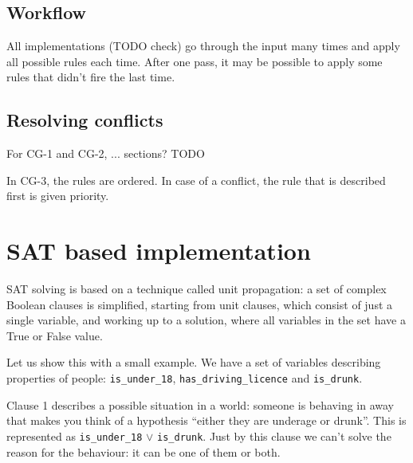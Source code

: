 \documentclass[a4paper, 11pt]{article}
\begin{document}
\subsection{Workflow}

All implementations (TODO check) go through the input many times and apply all possible rules each time. 
After one pass, it may be possible to apply some rules that didn't fire the last time.


\subsection{Resolving conflicts}

For CG-1 and CG-2, ... sections? TODO

In CG-3, the rules are ordered. In case of a conflict, the rule that is described first is given priority.


\section{SAT based implementation}

SAT solving is based on a technique called unit propagation:
a set of complex Boolean clauses is simplified, starting from unit
clauses, which consist of just a single variable, and working up to a solution, where all variables in the set
have a True or False value.

Let us show this with a small example.
We have a set of variables describing properties of people: \texttt{is\_under\_18},
\texttt{has\_driving\_licence} and \texttt{is\_drunk}.



Clause 1 describes a possible situation in a world: someone is behaving in away that makes you think of a hypothesis ``either they are underage or
drunk''. This is represented as \texttt{is\_under\_18} $\vee$
\texttt{is\_drunk}. Just by this clause we can't solve the reason for the
behaviour: it can be one of them or both.
\end{document}
